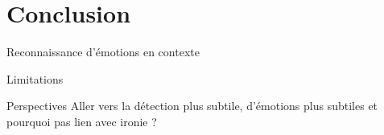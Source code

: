\documentclass[11pt,aspectratio=169]{beamer}
\begin{document}
\section{Conclusion}

\begin{frame}{Reconnaissance d'émotions en contexte}
    
\end{frame}

\begin{frame}{Limitations}
    
\end{frame}

\begin{frame}{Perspectives}
    Aller vers la détection plus subtile, d'émotions plus subtiles et pourquoi pas lien avec ironie ?
\end{frame}
\end{document}
